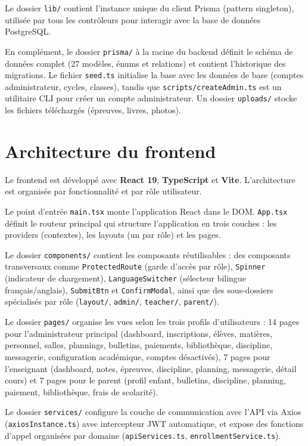 \documentclass[12pt, a4paper]{report}
\begin{document}
Le dossier \texttt{lib/} contient l'instance unique du client Prisma (pattern singleton), utilisée par tous les contrôleurs pour interagir avec la base de données PostgreSQL.

En complément, le dossier \texttt{prisma/} à la racine du backend définit le schéma de données complet (27 modèles, énums et relations) et contient l'historique des migrations. Le fichier \texttt{seed.ts} initialise la base avec les données de base (comptes administrateur, cycles, classes), tandis que \texttt{scripts/createAdmin.ts} est un utilitaire CLI pour créer un compte administrateur. Un dossier \texttt{uploads/} stocke les fichiers téléchargés (épreuves, livres, photos).

\section{Architecture du frontend}

Le frontend est développé avec \textbf{React 19}, \textbf{TypeScript} et \textbf{Vite}. L'architecture est organisée par fonctionnalité et par rôle utilisateur.

Le point d'entrée \texttt{main.tsx} monte l'application React dans le DOM. \texttt{App.tsx} définit le routeur principal qui structure l'application en trois couches : les providers (contextes), les layouts (un par rôle) et les pages.

Le dossier \texttt{components/} contient les composants réutilisables : des composants transversaux comme \texttt{ProtectedRoute} (garde d'accès par rôle), \texttt{Spinner} (indicateur de chargement), \texttt{LanguageSwitcher} (sélecteur bilingue français/anglais), \texttt{SubmitBtn} et \texttt{ConfirmModal}, ainsi que des sous-dossiers spécialisés par rôle (\texttt{layout/}, \texttt{admin/}, \texttt{teacher/}, \texttt{parent/}).

Le dossier \texttt{pages/} organise les vues selon les trois profils d'utilisateurs : 14 pages pour l'administrateur principal (dashboard, inscriptions, élèves, matières, personnel, salles, plannings, bulletins, paiements, bibliothèque, discipline, messagerie, configuration académique, comptes désactivés), 7 pages pour l'enseignant (dashboard, notes, épreuves, discipline, planning, messagerie, détail cours) et 7 pages pour le parent (profil enfant, bulletins, discipline, planning, paiement, bibliothèque, frais de scolarité).

Le dossier \texttt{services/} configure la couche de communication avec l'API via Axios (\texttt{axiosInstance.ts}) avec intercepteur JWT automatique, et expose des fonctions d'appel organisées par domaine (\texttt{apiServices.ts}, \texttt{enrollmentService.ts}).
\end{document}
